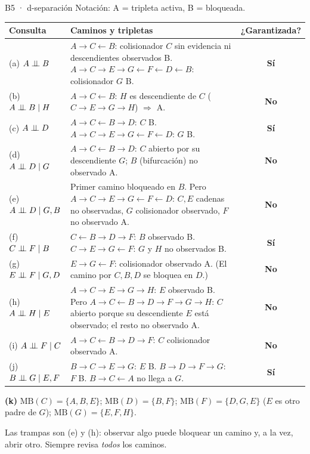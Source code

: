 \begin{solucion}{B5 · d-separación}
Notación: \textcolor{verde}{A} = tripleta activa, \textcolor{rojo}{B} = bloqueada.
\begin{center}\small
\renewcommand{\arraystretch}{1.25}
\begin{tabularx}{\linewidth}{l X c}
\toprule
Consulta & Caminos y tripletas & ¿Garantizada?\\\midrule
(a) $A\perp\!\!\!\perp B$ & $A\to C\leftarrow B$: colisionador $C$ sin evidencia ni descendientes observados \textcolor{rojo}{B}. $A\to C\to E\to G\leftarrow F\leftarrow D\leftarrow B$: colisionador $G$ \textcolor{rojo}{B}. & \textbf{Sí}\\
(b) $A\perp\!\!\!\perp B\mid H$ & $A\to C\leftarrow B$: $H$ es descendiente de $C$ ($C\to E\to G\to H$) $\Rightarrow$ \textcolor{verde}{A}. & \textbf{No}\\
(c) $A\perp\!\!\!\perp D$ & $A\to C\leftarrow B\to D$: $C$ \textcolor{rojo}{B}. $A\to C\to E\to G\leftarrow F\leftarrow D$: $G$ \textcolor{rojo}{B}. & \textbf{Sí}\\
(d) $A\perp\!\!\!\perp D\mid G$ & $A\to C\leftarrow B\to D$: $C$ abierto por su descendiente $G$; $B$ (bifurcación) no observado \textcolor{verde}{A}. & \textbf{No}\\
(e) $A\perp\!\!\!\perp D\mid G,B$ & Primer camino bloqueado en $B$. Pero $A\to C\to E\to G\leftarrow F\leftarrow D$: $C,E$ cadenas no observadas, $G$ colisionador observado, $F$ no observado \textcolor{verde}{A}. & \textbf{No}\\
(f) $C\perp\!\!\!\perp F\mid B$ & $C\leftarrow B\to D\to F$: $B$ observado \textcolor{rojo}{B}. $C\to E\to G\leftarrow F$: $G$ y $H$ no observados \textcolor{rojo}{B}. & \textbf{Sí}\\
(g) $E\perp\!\!\!\perp F\mid G,D$ & $E\to G\leftarrow F$: colisionador observado \textcolor{verde}{A}. (El camino por $C,B,D$ se bloquea en $D$.) & \textbf{No}\\
(h) $A\perp\!\!\!\perp H\mid E$ & $A\to C\to E\to G\to H$: $E$ observado \textcolor{rojo}{B}. Pero $A\to C\leftarrow B\to D\to F\to G\to H$: $C$ abierto porque su descendiente $E$ está observado; el resto no observado \textcolor{verde}{A}. & \textbf{No}\\
(i) $A\perp\!\!\!\perp F\mid C$ & $A\to C\leftarrow B\to D\to F$: $C$ colisionador observado \textcolor{verde}{A}. & \textbf{No}\\
(j) $B\perp\!\!\!\perp G\mid E,F$ & $B\to C\to E\to G$: $E$ \textcolor{rojo}{B}. $B\to D\to F\to G$: $F$ \textcolor{rojo}{B}. $B\to C\leftarrow A$ no llega a $G$. & \textbf{Sí}\\\bottomrule
\end{tabularx}
\end{center}
\textbf{(k)} $\mathrm{MB}(C)=\{A,B,E\}$; $\mathrm{MB}(D)=\{B,F\}$; $\mathrm{MB}(F)=\{D,G,E\}$ ($E$ es otro padre de $G$); $\mathrm{MB}(G)=\{E,F,H\}$.
\begin{nota}
Las trampas son (e) y (h): observar algo puede bloquear un camino y, a la vez, abrir otro. Siempre revisa \emph{todos} los caminos.
\end{nota}
\end{solucion}

